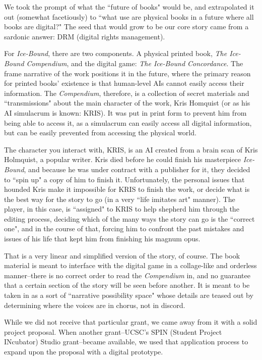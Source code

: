 We took the prompt of what the ``future of books" would be, and extrapolated it out (somewhat facetiously) to ``what use are physical books in a future where all books are digital?" The seed that would grow to be our core story came from a sardonic answer: DRM (digital rights management).

For \textit{Ice-Bound}, there are two components. A physical printed book, \textit{The Ice-Bound Compendium}, and the digital game: \textit{The Ice-Bound Concordance}. The frame narrative of the work positions it in the future, where the primary reason for printed books' existence is that human-level AIs cannot easily access their information. The \textit{Compendium}, therefore, is a collection of secret materials and ``transmissions" about the main character of the work, Kris Homquist (or as his AI simulacrum is known: KRIS). It was put in print form to prevent him from being able to access it, as a simulacrum can easily access all digital information, but can be easily prevented from accessing the physical world.

The character you interact with, KRIS, is an AI created from a brain scan of Kris Holmquist, a popular writer. Kris died before he could finish his masterpiece \textit{Ice-Bound}, and because he was under contract with a publisher for it, they decided to ``spin up" a copy of him to finish it. Unfortunately, the personal issues that hounded Kris make it impossible for KRIS to finish the work, or decide what is the best way for the story to go (in a very ``life imitates art" manner). The player, in this case, is ``assigned" to KRIS to help shepherd him through the editing process, deciding which of the many ways the story can go is the ``correct one", and in the course of that, forcing him to confront the past mistakes and issues of his life that kept him from finishing his magnum opus.

That is a very linear and simplified version of the story, of course. The book material is meant to interface with the digital game in a collage-like and orderless manner--there is no correct order to read the \textit{Compendium} in, and no guarantee that a certain section of the story will be seen before another. It is meant to be taken in as a sort of ``narrative possibility space" whose details are teased out by determining where the voices are in chorus, not in discord.

While we did not receive that particular grant, we came away from it with a solid project proposal. When another grant--UCSC's SPIN (Student Project INcubator) Studio grant--became available, we used that application process to expand upon the proposal with a digital prototype.

